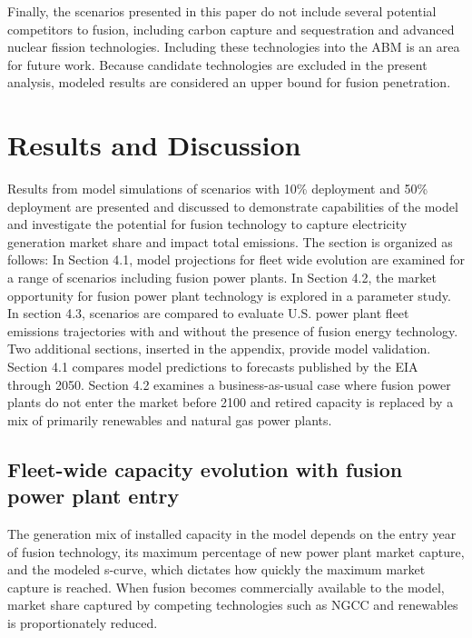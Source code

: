 \documentclass[preprint, 12pt]{elsarticle}
\begin{document}
Finally, the scenarios presented in this paper do not include several potential competitors to fusion, including carbon capture and sequestration and advanced nuclear fission technologies. Including these technologies into the ABM is an area for future work. Because candidate technologies are excluded in the present analysis, modeled results are considered an upper bound for fusion penetration.

\section{Results and Discussion}


Results from model simulations of scenarios with 10\% deployment and 50\% deployment are presented and discussed to demonstrate capabilities of the model and investigate the potential for fusion technology to capture electricity generation market share and impact total emissions. The section is organized as follows: In Section 4.1, model projections for fleet wide evolution are examined for a range of scenarios including fusion power plants. In Section 4.2, the market opportunity for fusion power plant technology is explored in a parameter study. In section 4.3, scenarios are compared to evaluate U.S. power plant fleet emissions trajectories with and without the presence of fusion energy technology. Two additional sections, inserted in the appendix, provide model validation. Section 4.1 compares model predictions to forecasts published by the EIA through 2050. Section 4.2 examines a business-as-usual case where fusion power plants do not enter the market before 2100 and retired capacity is replaced by a mix of primarily renewables and natural gas power plants. 

\subsection{Fleet-wide capacity evolution with fusion power plant entry}

The generation mix of installed capacity in the model depends on the entry year of fusion technology, its maximum percentage of new power plant market capture, and the modeled s-curve, which dictates how quickly the maximum market capture is reached. When fusion becomes commercially available to the model, market share captured by competing technologies such as NGCC and renewables is proportionately reduced.
\end{document}
